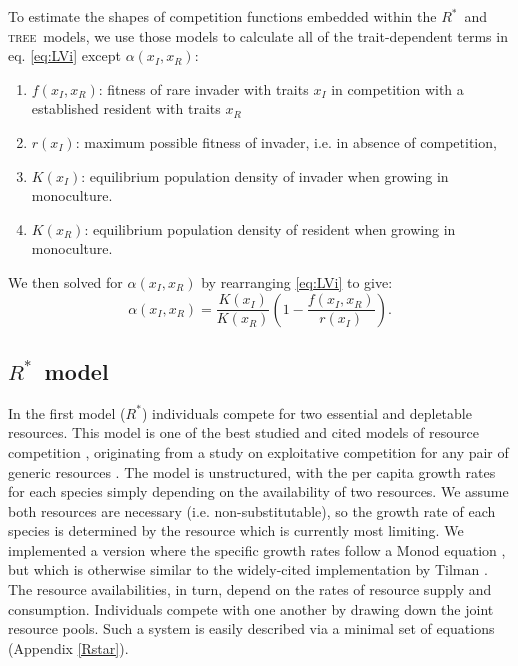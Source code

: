 \documentclass[a4paper,11pt]{article}
\newcommand{\Rstar}{\ensuremath{R^*}}
\newcommand{\TREE}{\textsc{tree}}
\begin{document}
To estimate the shapes of competition functions embedded within the \Rstar\
and \TREE\ models, we use those models to calculate all of the trait-dependent
terms in eq. \ref{eq:LVi} except $\alpha(x_I, x_R)$:
\begin{enumerate}
  \item $f(x_I, x_R)$: fitness of rare invader with traits $x_I$  in competition
  with a established resident with traits $x_R$
  \item $r(x_I)$: maximum possible fitness of invader, i.e. in absence of competition,
  \item $K(x_I)$: equilibrium population density of invader when growing in monoculture.
  \item $K(x_R)$: equilibrium population density of resident when growing in
  monoculture.
\end{enumerate}
We then solved for $\alpha(x_I, x_R)$ by rearranging  \ref{eq:LVi} to give:
\begin{equation}
  \label{eq:alpha}
 \alpha(x_I, x_R) = \frac{K(x_I)}{K(x_R)}
  \left(1 - \frac{f(x_I, x_R)}{r(x_I)}\right).
\end{equation}

\subsection{\Rstar\ model}


In the first model (\Rstar) individuals compete for two essential and
depletable resources. This model is one of the best studied and cited models
of resource competition \citep{Tilman-1977, Tilman-1982, Huisman-1999},
originating from a study on exploitative competition for any pair of generic
resources \citep{Leon-1975}. The model is unstructured, with the per capita
growth rates for each species simply depending on the availability of two
resources. We assume both resources are necessary (i.e. non-substitutable), so
the growth rate of each species is determined by the resource which is
currently most limiting. We implemented a version where the specific growth
rates follow a Monod equation \citet{Huisman-1999}, but which is otherwise
similar to the widely-cited implementation by Tilman \citep{Tilman-1977,
Tilman-1982}.  The resource availabilities, in turn, depend on the rates of
resource supply and consumption. Individuals compete with one another by
drawing down the joint resource pools. Such a system is easily described via a
minimal set of equations (Appendix \ref{Rstar}).
\end{document}

